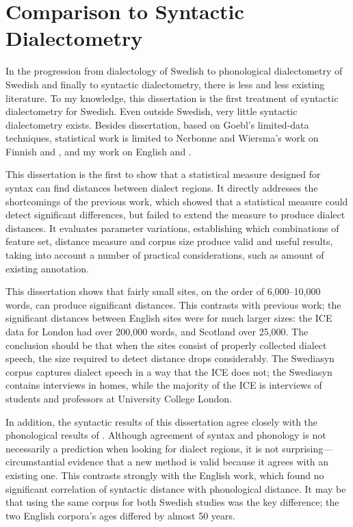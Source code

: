 \section{Comparison to Syntactic Dialectometry}

In the progression from dialectology of Swedish to phonological
dialectometry of Swedish and finally to syntactic dialectometry, there
is less and less existing literature. To my knowledge, this dissertation is
the first treatment of syntactic dialectometry for Swedish. Even
outside Swedish, very little syntactic dialectometry exists. Besides
 dissertation, based on Goebl's limited-data
techniques, statistical work is limited to Nerbonne and Wiersma's work
on Finnish \cite{nerbonne06} and \cite{wiersma09}, and my work on
English \cite{sanders07} and \cite{sanders08b}.

This dissertation is the first to show that a statistical measure
designed for syntax can find distances between dialect regions. It
directly addresses the shortcomings of the previous work, which showed
that a statistical measure could detect significant differences, but failed to
extend the measure to produce dialect distances. It evaluates
parameter variations, establishing which combinations of feature set,
distance measure and corpus size produce valid and useful results,
taking into account a number of practical considerations, such as
amount of existing annotation.

This dissertation shows that fairly small sites, on the order of
6,000--10,000 words, can produce significant distances. This contrasts
with previous work; the significant distances between English sites
were for much larger sizes: the ICE data for London had over 200,000
words, and Scotland over 25,000. The conclusion should be that when
the sites consist of properly collected dialect speech, the size
required to detect distance drops considerably. The Swediasyn corpus
captures dialect speech in a way that the ICE does not; the Swediasyn
contains interviews in homes, while the majority of the ICE is
interviews of students and professors at University College London.

In addition, the syntactic results of this dissertation agree closely
with the phonological results of . Although
agreement of syntax and phonology is not necessarily a prediction when
looking for dialect regions, it is not surprising---circumstantial
evidence that a new method is valid because it agrees with an existing
one. This contrasts strongly with the English work, which found no
significant correlation of syntactic distance with phonological
distance. It may be that using the same corpus for both Swedish
studies was the key difference; the two English corpora's ages differed by
almost 50 years.

